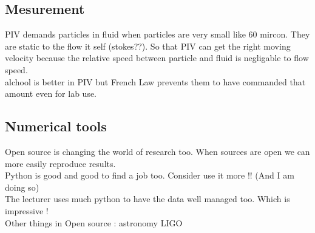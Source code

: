 \documentclass[a4paper,10pt,francais]{article}
\begin{document}
\subsection{Mesurement}
PIV demands particles in fluid when particles are very small like 60 mircon. They are static to the flow it self (stokes??). So that PIV can get the right moving velocity because the relative speed between particle and fluid is negligable to flow speed. \\

alchool is better in PIV but French Law prevents them to have commanded that amount even for lab use. \\

\subsection{Numerical tools}
Open source is changing the world of research too. When sources are open we can more easily reproduce results. \\

Python is good and good to find a job too. Consider use it more !! (And I am doing so)\\
The lecturer uses much python to have the data well managed too. Which is impressive !\\

Other things in Open source : astronomy LIGO
\end{document}
